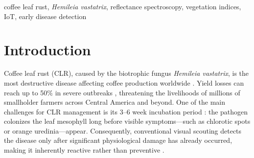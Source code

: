 \documentclass[conference]{IEEEtran}
\begin{document}
\begin{abstract}
Coffee leaf rust (CLR; \textit{Hemileia vastatrix}) causes severe yield losses, yet visual detection occurs only after irreversible damage. We present a portable reflectance IoT prototype for early, non-destructive CLR detection in two susceptible coffee varieties: Bourbon and Pacamara. The device integrates a Ocean Optics spectrometer, bifurcated optical fiber, and deuterium-halogen light source for reflectance acquisition from attached leaves. Leaves were classified as healthy (H, young) and rust-infected (R, symptomatic). Eight reflectance indices were computed: RCI, EDI, FSR, NDVI, PRI, PSRI, NDRE, and mNDVI705. Statistical analysis (Kruskal-Wallis with Dunn post-hoc) revealed that EDI, PRI, NDRE, and mNDVI705 significantly distinguished healthy from rust-infected leaves (p $< 0.001$). EDI showed the most consistent discrimination - diferenciando-, with changes between the both groups of 37\% in Bourbon (healthy: 0.438 and rust: 0.275) and 41\% in Pacamara (healthy: 0.410 and rust: 0.241). PRI exhibited the largest relative change, being 130\% higher in Bourbon and 407\% in Pacamara. The prototype offers a low-cost, field-deployable early warning solution through IoT integration.
\end{abstract}

\begin{IEEEkeywords}
coffee leaf rust, \textit{Hemileia vastatrix}, reflectance spectroscopy, vegetation indices, IoT, early disease detection
\end{IEEEkeywords}

\section{Introduction}
Coffee leaf rust (CLR), caused by the biotrophic fungus \textit{Hemileia vastatrix}, is the most destructive disease affecting coffee production worldwide \cite{talhinhas2017,chemuramutanga2018}. Yield losses can reach up to 50\% in severe outbreaks \cite{marin2021}, threatening the livelihoods of millions of smallholder farmers across Central America and beyond. One of the main challenges for CLR management is its 3--6 week incubation period \cite{kushalappa1983}: the pathogen colonizes the leaf mesophyll long before visible symptoms—such as chlorotic spots or orange uredinia—appear. Consequently, conventional visual scouting detects the disease only after significant physiological damage has already occurred, making it inherently reactive rather than preventive \cite{castro2018}.
\end{document}
